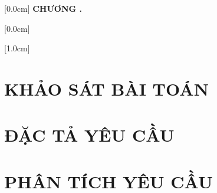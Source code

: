 \documentclass[a4paper,13pt,3p,oneside]{report}
\title{\bf \TITLE}
\author{\AUTHOR}
\renewcommand{\headrulewidth}{0pt} %
\theoremstyle{definition}
\begin{document}

\clearpage
{} 


\clearpage


\clearpage

\renewcommand*\contentsname{MỤC LỤC}

    [0.0cm]             %
    {\bfseries\vspace{0.3cm}}                  %
    {{\bfseries{\scshape} CHƯƠNG \thecontentslabel.\ }} %
    {}         %
    {\contentspage}         %

    [0.0cm]             %
    {\vspace{0.3cm}}                  %
    {\thecontentslabel \ } %
    {}         %
    {\contentspage}
    
    [1.0cm]             %
    {\vspace{0.3cm}}                  %
    {\thecontentslabel \ } %
    {}         %
    {\contentspage}

\tableofcontents 
\thispagestyle{empty}
\clearpage


\pagestyle{fancy}
\fancyhf{} 
\renewcommand{\headrulewidth}{0pt} 
\fancyfoot[C]{\thepage} 


\clearpage
\chapter{KHẢO SÁT BÀI TOÁN}
\label{chapter:1}


\clearpage
\chapter{ĐẶC TẢ YÊU CẦU}
\label{chapter:2}


\clearpage
\chapter{PHÂN TÍCH YÊU CẦU}
\label{chapter:3}

\end{document}
